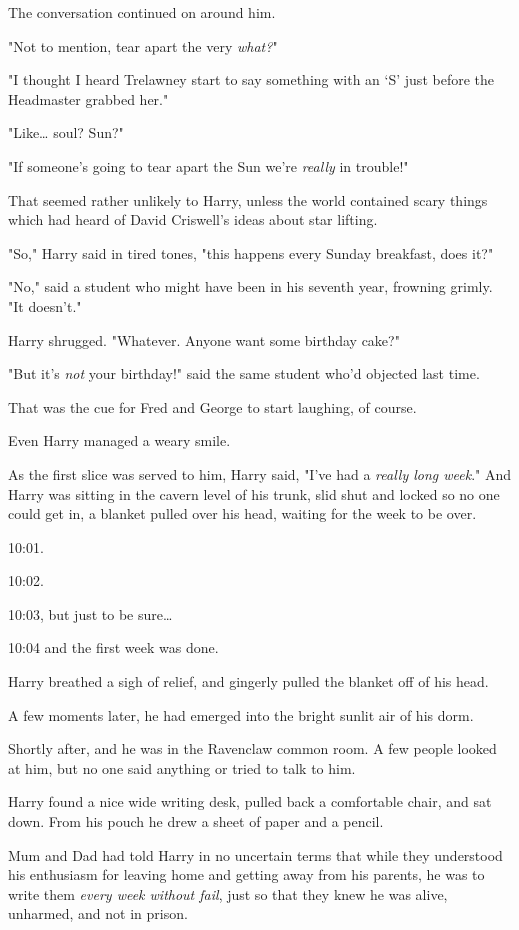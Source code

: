 The conversation continued on around him.

"Not to mention, tear apart the very \emph{what?}"

"I thought I heard Trelawney start to say something with an `S' just before the
Headmaster grabbed her."

"Like{\ldots} soul? Sun?"

"If someone's going to tear apart the Sun we're \emph{really} in trouble!"

That seemed rather unlikely to Harry, unless the world contained scary things
which had heard of David Criswell's ideas about star lifting.

"So," Harry said in tired tones, "this happens every Sunday breakfast, does it?"

"No," said a student who might have been in his seventh year, frowning grimly.
"It doesn't."

Harry shrugged. "Whatever. Anyone want some birthday cake?"

"But it's \emph{not} your birthday!" said the same student who'd objected last
time.

That was the cue for Fred and George to start laughing, of course.

Even Harry managed a weary smile.

As the first slice was served to him, Harry said, "I've had a \emph{really long
week}."
\later
And Harry was sitting in the cavern level of his trunk, slid shut and locked so
no one could get in, a blanket pulled over his head, waiting for the week to be
over.

10:01.

10:02.

10:03, but just to be sure{\ldots}

10:04 and the first week was done.

Harry breathed a sigh of relief, and gingerly pulled the blanket off of his
head.

A few moments later, he had emerged into the bright sunlit air of his dorm.

Shortly after, and he was in the Ravenclaw common room. A few people looked at
him, but no one said anything or tried to talk to him.

Harry found a nice wide writing desk, pulled back a comfortable chair, and sat
down. From his pouch he drew a sheet of paper and a pencil.

Mum and Dad had told Harry in no uncertain terms that while they understood his
enthusiasm for leaving home and getting away from his parents, he was to write
them \emph{every week without fail}, just so that they knew he was alive,
unharmed, and not in prison.

